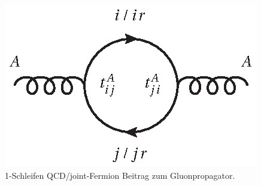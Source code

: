 \begin{figure}[h]
\centering
 \includegraphics{abschnitte/n-schleifen/fig/QCD3.eps}
 \caption{1-Schleifen QCD/joint-Fermion Beitrag zum Gluonpropagator.}\label{fig:n-schleifen:QCD3}
\end{figure}